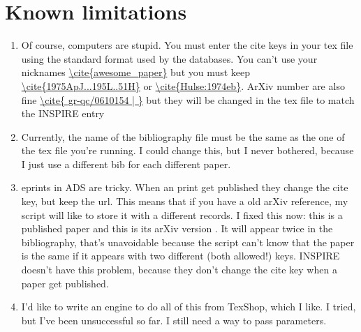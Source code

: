 \documentclass[floats,floatfix,showpacs,amssymb,twocolumn,superscriptaddress,nofootinbib]{revtex4}
\begin{document}
\section{Known limitations}
\begin{enumerate}

\item Of course, computers are stupid. You must enter the cite keys in your tex file using the standard format used by the databases. You can't use your nicknames \url{\cite{awesome_paper}} but you must keep \url{\cite{1975ApJ...195L..51H}} or \url{\cite{Hulse:1974eb}}. ArXiv number are also fine \url{\cite{ gr-qc/0610154 | }} but they will be changed in the tex file to match the INSPIRE entry

\item Currently, the name of the bibliography file must be  the same as the one of the tex file you're running. I could change this, but I never bothered, because I just use a different bib for each different paper.

\item eprints in ADS are tricky. When an print get published they change the cite key, but keep the url. This means that if you have a old arXiv reference, my script will like to store it with a different records. I fixed this now: this is a published paper \cite{2010PhRvD..81h4054K} and this is its arXiv version \cite{2010arXiv1002.2643K}. It will appear twice in the bibliography, that's unavoidable because the script can't know that the paper is the same if it appears with two different (both allowed!) keys. INSPIRE doesn't have this problem, because they don't change the cite key when a paper get published.
\item I'd like to write an engine to do all of this from TexShop, which I like. I tried, but I've been unsuccessful so far. I still need a way to pass parameters.  

\end{enumerate}


\end{document}
